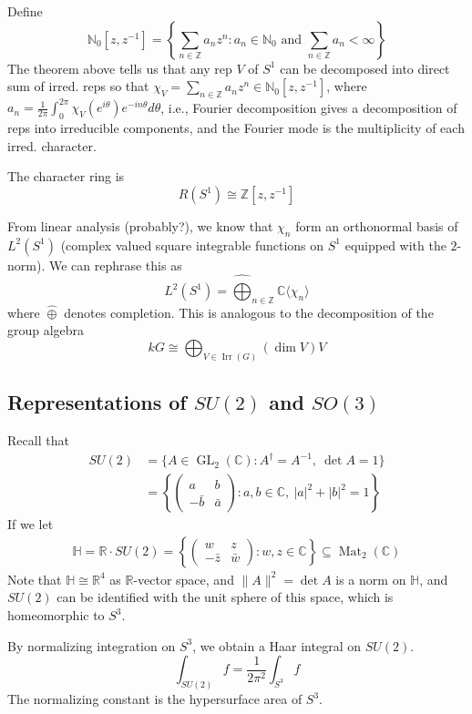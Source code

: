 \documentclass{article}
\theoremstyle{definition}
\theoremstyle{remark}
\theoremstyle{plain}
\newcommand{\NN}{\mathbb{N}}
\newcommand{\ZZ}{\mathbb{Z}}
\newcommand{\RR}{\mathbb{R}}
\newcommand{\CC}{\mathbb{C}}
\begin{document}
Define 
\[\NN_0[z,z^{-1}]=\left\{\sum_{n\in\ZZ}a_nz^n:a_n\in\NN_0\text{ and }\sum_{n\in\ZZ}a_n<\infty\right\}\]
The theorem above tells us that any rep $V$ of $S^1$ can be decomposed into direct sum of irred. reps so that $\chi_V=\sum_{n\in\ZZ}a_nz^n\in\NN_0[z,z^{-1}]$, where $a_n=\frac{1}{2\pi}\int_0^{2\pi}\chi_V(e^{i\theta})e^{-in\theta}d\theta$, i.e., Fourier decomposition gives a decomposition of reps into irreducible components, and the Fourier mode is the multiplicity of each irred. character.

The character ring is 
\[R(S^1)\cong \ZZ[z,z^{-1}]\]

From linear analysis (probably?), we know that $\chi_n$ form an orthonormal basis of $L^2(S^1)$ (complex valued square integrable functions on $S^1$ equipped with the $2$-norm). We can rephrase this as 
\[L^2(S^1)=\hat\bigoplus_{n\in\ZZ}\CC\langle\chi_n\rangle\]
where $\hat\oplus$ denotes completion. This is analogous to the decomposition of the group algebra
\[kG\cong \bigoplus_{V\in\operatorname{Irr}(G)}(\dim V)V\]

\subsection{Representations of $SU(2)$ and $SO(3)$}

Recall that
\begin{align*}SU(2)&=\{A\in\operatorname{GL}_2(\CC):A^\dagger=A^{-1},\ \det A=1\}\\
&=\left\{\begin{pmatrix}
    a&b\\
    -\bar b&\bar a
\end{pmatrix}:a,b\in\CC,\ |a|^2+|b|^2=1\right\}
\end{align*}
If we let
\begin{align*}
    \mathbb H=\RR\cdot SU(2)=\left\{\begin{pmatrix}
        w&z\\ -\bar z&\bar w
    \end{pmatrix}:w,z\in\CC\right\}\subseteq \operatorname{Mat}_2(\CC)
\end{align*}
Note that $\mathbb H\cong\RR^4$ as $\RR$-vector space, and $\|A\|^2=\det A$ is a norm on $\mathbb H$, and $SU(2)$ can be identified with the unit sphere of this space, which is homeomorphic to $S^3$.

By normalizing integration on $S^3$, we obtain a Haar integral on $SU(2)$.
\[\int_{SU(2)}f=\dfrac{1}{2\pi^2}\int_{S^3}f\]
The normalizing constant is the hypersurface area of $S^3$.
\end{document}
